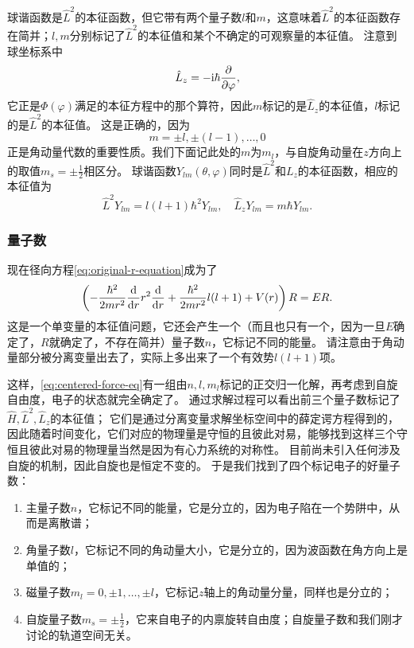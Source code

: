 \documentclass[UTF8, a4paper]{ctexart}
\newcommand*{\ii}{\mathrm{i}}
\begin{document}
球谐函数是$\hat{L}^2$的本征函数，但它带有两个量子数$l$和$m$，这意味着$\hat{L}^2$的本征函数存在简并；$l,m$分别标记了$\hat{L}^2$的本征值和某个不确定的可观察量的本征值。
注意到球坐标系中
\[
    \hat{L}_z = - \ii \hbar \pdv{\varphi},
\]
它正是$\Phi(\varphi)$满足的本征方程中的那个算符，因此$m$标记的是$\hat{L}_z$的本征值，$l$标记的是$\hat{L}^2$的本征值。
这是正确的，因为
\[
    m = \pm l, \pm (l-1), \ldots, 0
\]
正是角动量代数的重要性质。我们下面记此处的$m$为$m_l$，与自旋角动量在$z$方向上的取值$m_s = \pm \frac{1}{2}$相区分。
球谐函数$Y_{lm}(\theta, \varphi)$同时是$\hat{L}^2$和$L_z$的本征函数，相应的本征值为
\begin{equation}
    \hat{L}^2 Y_{lm} = l(l+1) \hbar^2 Y_{lm}, \quad \hat{L}_z Y_{lm} = m \hbar Y_{lm}.
\end{equation}

\subsubsection{量子数}

现在径向方程\eqref{eq:original-r-equation}成为了
\begin{equation}
    \left( - \frac{\hbar^2}{2m r^2} \dv{r} r^2 \dv{r} + \frac{\hbar^2}{2m r^2} l(l+1) + V(r) \right) R = E R.
    \label{eq:r-equation}
\end{equation}
这是一个单变量的本征值问题，它还会产生一个（而且也只有一个，因为一旦$E$确定了，$R$就确定了，不存在简并）量子数$n$，它标记不同的能量。
请注意由于角动量部分被分离变量出去了，实际上多出来了一个有效势$l(l+1)$项。

这样，\eqref{eq:centered-force-eq}有一组由$n, l, m_l$标记的正交归一化解，再考虑到自旋自由度，电子的状态就完全确定了。
通过求解过程可以看出前三个量子数标记了$\hat{H}, \hat{L}^2, \hat{L}_z$的本征值；
它们是通过分离变量求解坐标空间中的薛定谔方程得到的，因此随着时间变化，它们对应的物理量是守恒的且彼此对易，能够找到这样三个守恒且彼此对易的物理量当然是因为有心力系统的对称性。
目前尚未引入任何涉及自旋的机制，因此自旋也是恒定不变的。
于是我们找到了四个标记电子的好量子数：
\begin{enumerate}
    \item 主量子数$n$，它标记不同的能量，它是分立的，因为电子陷在一个势阱中，从而是离散谱；
    \item 角量子数$l$，它标记不同的角动量大小，它是分立的，因为波函数在角方向上是单值的；
    \item 磁量子数$m_l = 0, \pm 1, \ldots, \pm l$，它标记$z$轴上的角动量分量，同样也是分立的；
    \item 自旋量子数$m_s = \pm \frac{1}{2}$，它来自电子的内禀旋转自由度；自旋量子数和我们刚才讨论的轨道空间无关。
\end{enumerate}
\end{document}
